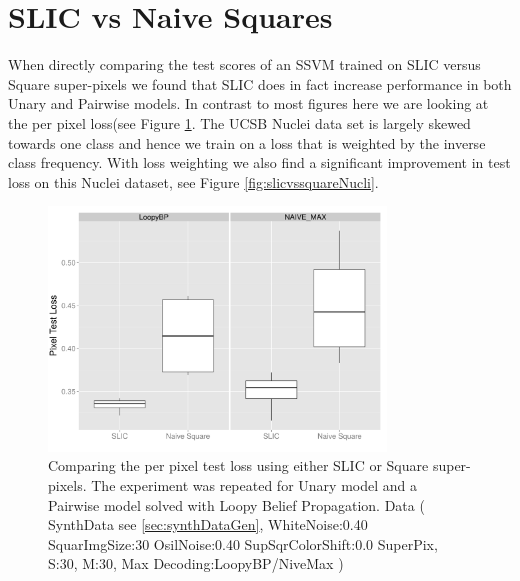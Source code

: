 \section{SLIC vs Naive Squares}
When directly comparing the test scores of an SSVM trained on SLIC versus Square super-pixels we found that SLIC does in fact increase performance in both Unary and Pairwise models. 
In contrast to most figures here we are looking at the per pixel loss(see Figure \ref{fig:slicvssquarePix}. The UCSB Nuclei data set is largely skewed towards one class and hence we train on a loss that is weighted by the inverse class frequency. With loss weighting we also find a significant improvement in test loss on this Nuclei dataset, see Figure \ref{fig:slicvssquareNucli}.  


%
\begin{figure}
  \centering
  \includegraphics[width=0.8\textwidth]{images/slicVsNaiveSquare_pix_synGen.png}
  \caption{ Comparing the per pixel test loss using either SLIC or Square super-pixels. The experiment was repeated for Unary model and a Pairwise model solved with Loopy Belief Propagation.  Data ( SynthData see \ref{sec:synthDataGen}, WhiteNoise:0.40 SquarImgSize:30 OsilNoise:0.40 SupSqrColorShift:0.0 SuperPix, S:30, M:30, Max Decoding:LoopyBP/NiveMax )  } 
  \label{fig:slicvssquarePix}
\end{figure} 
%


